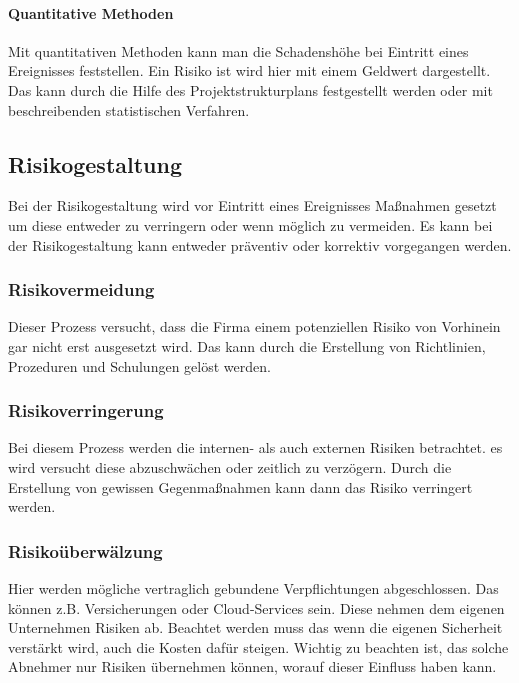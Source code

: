 \paragraph{Quantitative Methoden}
Mit quantitativen Methoden kann man die Schadenshöhe bei Eintritt eines Ereignisses feststellen. Ein Risiko ist wird hier mit einem Geldwert dargestellt.
Das kann durch die Hilfe des Projektstrukturplans festgestellt werden oder mit beschreibenden statistischen Verfahren.


\subsection{Risikogestaltung}
Bei der Risikogestaltung wird vor Eintritt eines Ereignisses Maßnahmen gesetzt um diese entweder zu verringern oder wenn möglich zu vermeiden.
Es kann bei der Risikogestaltung kann entweder präventiv oder korrektiv vorgegangen werden.

\subsubsection{Risikovermeidung}
Dieser Prozess versucht, dass die Firma einem potenziellen Risiko von Vorhinein gar nicht erst ausgesetzt wird. Das kann durch die Erstellung von Richtlinien, Prozeduren und Schulungen gelöst werden.

\subsubsection{Risikoverringerung}
Bei diesem Prozess werden die internen- als auch externen Risiken betrachtet. es wird versucht diese abzuschwächen oder zeitlich zu verzögern. Durch die Erstellung von gewissen Gegenmaßnahmen kann dann das Risiko verringert werden.

\subsubsection{Risikoüberwälzung}
Hier werden mögliche vertraglich gebundene Verpflichtungen abgeschlossen. Das können z.B. Versicherungen oder Cloud-Services sein. Diese nehmen dem eigenen Unternehmen Risiken ab. Beachtet werden muss das wenn die eigenen Sicherheit verstärkt wird, auch die Kosten dafür steigen. Wichtig zu beachten ist, das solche Abnehmer nur Risiken übernehmen können, worauf dieser Einfluss haben kann.

